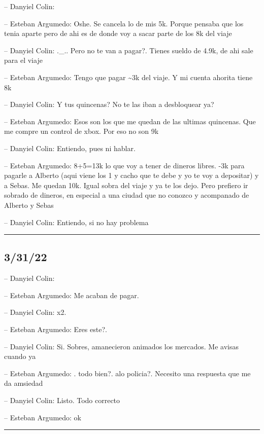 -- Danyiel Colin:

-- Esteban Argumedo: Oshe. Se cancela lo de mis 5k. Porque pensaba que
los tenia aparte pero de ahi es de donde voy a sacar parte de los 8k del
viaje

-- Danyiel Colin: .\_.. Pero no te van a pagar?. Tienes sueldo de 4.9k,
de ahi sale para el viaje

-- Esteban Argumedo: Tengo que pagar \textasciitilde3k del viaje. Y mi
cuenta ahorita tiene 8k

-- Danyiel Colin: Y tus quincenas? No te las iban a desbloquear ya?

-- Esteban Argumedo: Esos son los que me quedan de las ultimas
quincenas. Que me compre un control de xbox. Por eso no son 9k

-- Danyiel Colin: Entiendo, pues ni hablar.

-- Esteban Argumedo: 8+5=13k lo que voy a tener de dineros libres. -3k
para pagarle a Alberto (aqui viene los 1 y cacho que te debe y yo te voy
a depositar) y a Sebas. Me quedan 10k. Igual sobra del viaje y ya te los
dejo. Pero prefiero ir sobrado de dineros, en especial a una ciudad que
no conozco y acompanado de Alberto y Sebas

-- Danyiel Colin: Entiendo, si no hay problema

\begin{center}\rule{0.5\linewidth}{0.5pt}\end{center}

\hypertarget{section-44}{%
\subsection{3/31/22}\label{section-44}}

-- Danyiel Colin:

-- Esteban Argumedo: Me acaban de pagar.

-- Danyiel Colin: x2.

-- Esteban Argumedo: Eres este?.

-- Danyiel Colin: Si. Sobres, amanecieron animados los mercados. Me
avisas cuando ya

-- Esteban Argumedo: . todo bien?. alo policia?. Necesito una respuesta
que me da amsiedad

-- Danyiel Colin: Listo. Todo correcto

-- Esteban Argumedo: ok

\begin{center}\rule{0.5\linewidth}{0.5pt}\end{center}

